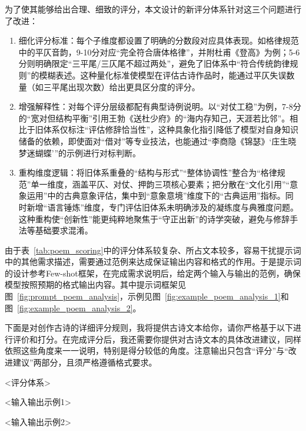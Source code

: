 为了使其能够给出合理、细致的评分，本文设计的新评分体系针对这三个问题进行了改进：

\begin{enumerate}
  \item 细化评分标准：每个子维度都设置了明确的分数段对应具体表现。如格律规范中的平仄音韵，9-10分对应“完全符合唐体格律”，并附杜甫《登高》为例；5-6分则明确限定“三平尾/三仄尾不超过两处”，避免了旧体系中“符合传统韵律规则”的模糊表述。这种量化标准使模型在评估古诗作品时，能通过平仄失误数量（如三平尾出现次数）给出更具区分度的评分。
  \item 增强解释性：对每个评分层级都配有典型诗例说明。以“对仗工稳”为例，7-8分的“宽对但结构平衡”引用王勃《送杜少府》的“海内存知己，天涯若比邻”。相比于旧体系仅标注“评估修辞恰当性”，这种具象化指引降低了模型对自身知识储备的依赖，即使面对“借对”等专业技法，也能通过“李商隐《锦瑟》`庄生晓梦迷蝴蝶'”的示例进行对标判断。
  \item 重构维度逻辑：将旧体系重叠的“结构与形式”“整体协调性”整合为“格律规范”单一维度，涵盖平仄、对仗、押韵三项核心要素；把分散在“文化引用”“意象运用”中的古典意象评估，集中到“意象意境”维度下的“古典运用”指标。同时新增“语言锤炼”维度，专门评估旧体系未明确涉及的凝练度与典雅度问题。这种重构使“创新性”能更纯粹地聚焦于“守正出新”的诗学突破，避免与修辞手法等基础要求混淆。
\end{enumerate}


由于表~\ref{tab:poem_scoring}中的评分体系较复杂、所占文本较多，容易干扰提示词中的其他需求描述，需要通过范例来达成保证输出内容和格式的作用。于是提示词的设计参考Few-shot框架，在完成需求说明后，给定两个输入与输出的范例，确保模型按照预期的格式输出内容。其中提示词框架见图~\ref{fig:prompt_poem_analysis}，示例见图~\ref{fig:example_poem_analysis_1}和图~\ref{fig:example_poem_analysis_2}。


\begin{tcolorbox}[
  colback=white, %
  colframe=black, 
  boxrule=1pt,        %
  arc=0mm             %
  ]
  \kaishu 下面是对创作古诗的详细评分规则，我将提供古诗文本给你，请你严格基于以下进行评价和打分。在完成评分后，我还需要你提供对古诗文本的具体改进建议，同样依照这些角度来一一说明，特别是得分较低的角度。注意输出只包含“评分”与“改进建议”两部分，且须严格遵循格式要求。

  <评分体系>

  <输入输出示例1>

  <输入输出示例2>
\end{tcolorbox}

